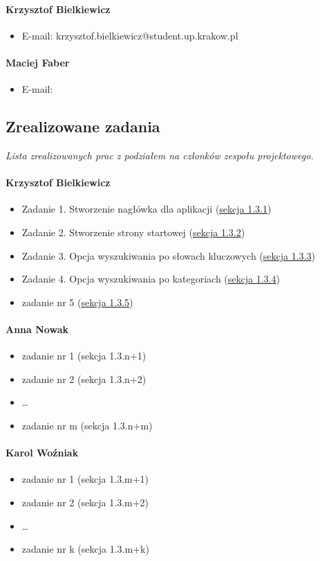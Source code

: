 \documentclass[12pt,a4paper,oneside]{article}
\theoremstyle{definition}
\numberwithin{equation}{section}
\begin{document}
    \paragraph{Krzysztof Bielkiewicz}
    \begin{itemize}
        \item E-mail:  krzysztof.bielkiewicz@student.up.krakow.pl
    \end{itemize}
    \paragraph{Maciej Faber}
    \begin{itemize}
        \item E-mail:
    \end{itemize}

\subsection{Zrealizowane zadania}
\textit{Lista zrealizowanych prac z podziałem na członków zespołu projektowego.}
\paragraph{Krzysztof Bielkiewicz}
\begin{itemize}
\item Zadanie 1. Stworzenie nagłówka dla aplikacji (\hyperref[1.3.1]{sekcja 1.3.1})
\item Zadanie 2. Stworzenie strony startowej (\hyperref[1.3.2]{sekcja 1.3.2})
\item Zadanie 3. Opcja wyszukiwania po słowach kluczowych (\hyperref[1.3.3]{sekcja 1.3.3})
\item Zadanie 4. Opcja wyszukiwania po kategoriach (\hyperref[1.3.4]{sekcja 1.3.4})
\item zadanie nr 5 (\hyperref[1.3.5]{sekcja 1.3.5})
\end{itemize}
\paragraph{Anna Nowak}
\begin{itemize}
\item zadanie nr 1 (sekcja 1.3.n+1)
\item zadanie nr 2 (sekcja 1.3.n+2)
\item \dots
\item zadanie nr m (sekcja 1.3.n+m)
\end{itemize}
\paragraph{Karol Woźniak}
\begin{itemize}
\item zadanie nr 1 (sekcja 1.3.m+1)
\item zadanie nr 2 (sekcja 1.3.m+2)
\item \dots
\item zadanie nr k (sekcja 1.3.m+k)

\end{itemize}
\end{document}
